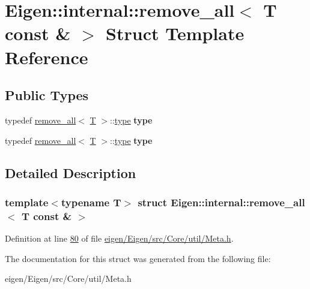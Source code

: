 \hypertarget{struct_eigen_1_1internal_1_1remove__all_3_01_t_01const_01_6_01_4}{}\section{Eigen\+:\+:internal\+:\+:remove\+\_\+all$<$ T const \& $>$ Struct Template Reference}
\label{struct_eigen_1_1internal_1_1remove__all_3_01_t_01const_01_6_01_4}
\subsection*{Public Types}
\begin{DoxyCompactItemize}
\item 
\mbox{\label{struct_eigen_1_1internal_1_1remove__all_3_01_t_01const_01_6_01_4_ad57977ae3c47c6738bd4c3d5d317cb5b}} 
typedef \hyperlink{struct_eigen_1_1internal_1_1remove__all}{remove\+\_\+all}$<$ \hyperlink{group___sparse_core___module}{T} $>$\+::\hyperlink{group___sparse_core___module}{type} {\bfseries type}
\item 
\mbox{\label{struct_eigen_1_1internal_1_1remove__all_3_01_t_01const_01_6_01_4_ad57977ae3c47c6738bd4c3d5d317cb5b}} 
typedef \hyperlink{struct_eigen_1_1internal_1_1remove__all}{remove\+\_\+all}$<$ \hyperlink{group___sparse_core___module}{T} $>$\+::\hyperlink{group___sparse_core___module}{type} {\bfseries type}
\end{DoxyCompactItemize}


\subsection{Detailed Description}
\subsubsection*{template$<$typename T$>$\newline
struct Eigen\+::internal\+::remove\+\_\+all$<$ T const \& $>$}



Definition at line \hyperlink{eigen_2_eigen_2src_2_core_2util_2_meta_8h_source_l00080}{80} of file \hyperlink{eigen_2_eigen_2src_2_core_2util_2_meta_8h_source}{eigen/\+Eigen/src/\+Core/util/\+Meta.\+h}.



The documentation for this struct was generated from the following file\+:\begin{DoxyCompactItemize}
\item 
eigen/\+Eigen/src/\+Core/util/\+Meta.\+h\end{DoxyCompactItemize}

